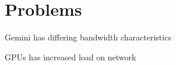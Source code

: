 \section{Problems}

Gemini has differing bandwidth characteristics

GPUs has increased load on network

